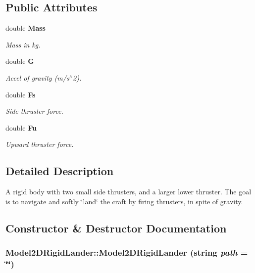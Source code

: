 \subsection*{Public Attributes}
\begin{CompactItemize}
\item 
double {\bf Mass}
\begin{CompactList}\small\item\em Mass in kg.\item\end{CompactList}\item 
double {\bf G}
\begin{CompactList}\small\item\em Accel of gravity (m/s$^\wedge$2).\item\end{CompactList}\item 
double {\bf Fs}
\begin{CompactList}\small\item\em Side thruster force.\item\end{CompactList}\item 
double {\bf Fu}
\begin{CompactList}\small\item\em Upward thruster force.\item\end{CompactList}\end{CompactItemize}


\subsection{Detailed Description}
A rigid body with two small side thrusters, and a larger lower thruster. The goal is to navigate and softly \char`\"{}land\char`\"{} the craft by firing thrusters, in spite of gravity.



\subsection{Constructor \& Destructor Documentation}
\subsubsection{\setlength{\rightskip}{0pt plus 5cm}Model2DRigid\-Lander::Model2DRigid\-Lander (string {\em path} = \char`\"{}\char`\"{})}\label{classModel2DRigidLander_a0}


